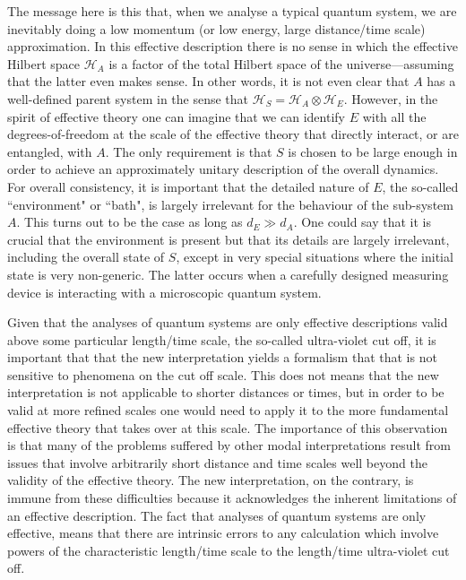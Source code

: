 \documentclass[%
preprint,
nofootinbib,
 amsmath,amssymb,
aps,
]{revtex4-1}
\def\BS{S}
\def\BA{A}
\def\BH{{\mathscr H}}
\begin{document}
The message here is this that, when we analyse a typical quantum system, we are inevitably doing a low momentum (or low energy, large distance/time scale) approximation. In this effective description there is no sense in which the effective Hilbert space $\BH_\BA$ is a factor of the total Hilbert space of the universe---assuming that the latter even makes sense. In other words, it is not even clear that $\BA$ has a well-defined parent system in the sense that $\BH_\BS=\BH_\BA\otimes\BH_E$. However, in the spirit of effective theory
one can imagine that we can identify $E$ with all the degrees-of-freedom at the scale of the effective theory that directly interact, or are entangled, with $\BA$. The only requirement is that 
$\BS$ is chosen to be large enough in order to achieve an approximately unitary description of the overall dynamics. For overall consistency, it is important that the detailed nature of $E$, the so-called ``environment" or ``bath", is largely irrelevant for the behaviour of the sub-system $\BA$. This turns out to be the case as long as $d_E\gg d_A$. One could say that it is crucial that the environment is present but that its details are largely irrelevant, including the overall state of $\BS$, except in very special situations where the initial state is very non-generic. The latter occurs when a carefully designed measuring device is interacting with a microscopic quantum system.

Given that the analyses of quantum systems are only effective descriptions valid above some particular length/time scale, the so-called ultra-violet cut off, it is important that that the new interpretation 
yields a formalism that that is not 
sensitive to phenomena on the cut off scale. This does not means that the new interpretation  is not applicable to shorter distances or times, but in order to be valid at more refined scales one would need to apply it to the more fundamental effective theory that takes over at this scale. The importance of this observation is that many of the problems suffered by other modal interpretations result from issues that involve arbitrarily short distance and time scales well beyond the validity of the effective theory. The new interpretation, on the contrary, is immune from these difficulties because it acknowledges the inherent limitations of an effective description.
The fact that analyses of quantum systems are only effective, means that there are 
intrinsic errors to any calculation which involve powers of the characteristic length/time scale to the length/time ultra-violet cut off. 
\end{document}
